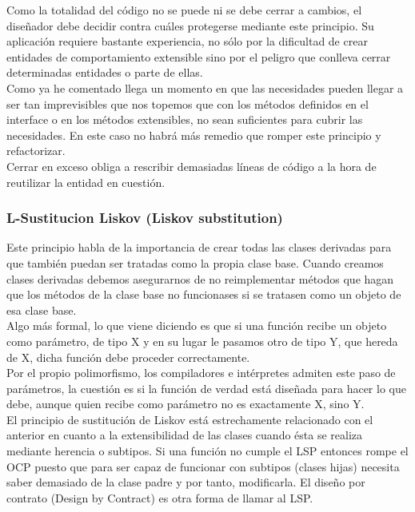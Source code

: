 \documentclass[../pfc.tex]{subfiles}
\begin{document}
	Como la totalidad del código no se puede ni se debe cerrar a cambios, el diseñador debe decidir contra cuáles protegerse mediante este principio. Su aplicación requiere bastante experiencia, no sólo por la dificultad de crear entidades de comportamiento extensible sino por el peligro que conlleva cerrar determinadas entidades o parte de ellas.\\
	
	Como ya he comentado llega un momento en que las necesidades pueden llegar a ser tan imprevisibles que nos topemos que con los métodos definidos en el interface o en los métodos extensibles, no sean suficientes para cubrir las necesidades. En este caso no habrá más remedio que romper este principio y refactorizar.\\
	
	Cerrar en exceso obliga a rescribir demasiadas líneas de código a la hora de reutilizar la entidad en cuestión. \\
	
	
	\subsubsection{L-Sustitucion Liskov (Liskov substitution)}
	
	Este principio habla de la importancia de crear todas las clases derivadas para que también puedan ser tratadas como la propia clase base. Cuando creamos clases derivadas debemos asegurarnos de no reimplementar métodos que hagan que los métodos de la clase base no funcionases si se tratasen como un objeto de esa clase base.\\
	
	Algo más formal, lo que viene diciendo es que si una función recibe un objeto como parámetro, de tipo X y en su lugar le pasamos otro de tipo Y, que hereda de X, dicha función debe proceder correctamente.\\
	
	Por el propio polimorfismo, los compiladores e intérpretes admiten este paso de parámetros, la cuestión es si la función de verdad está diseñada para hacer lo que debe, aunque quien recibe como parámetro no es exactamente X, sino Y.\\
	
	El principio de sustitución de Liskov está estrechamente relacionado con el anterior en cuanto a la extensibilidad de las clases cuando ésta se realiza mediante herencia o subtipos. Si una función no cumple el LSP entonces rompe el OCP puesto que para ser capaz de funcionar con subtipos (clases hijas) necesita saber demasiado de la clase padre y por tanto, modificarla. El diseño por contrato (Design by Contract) es otra forma de llamar al LSP.\\
	
\end{document}
